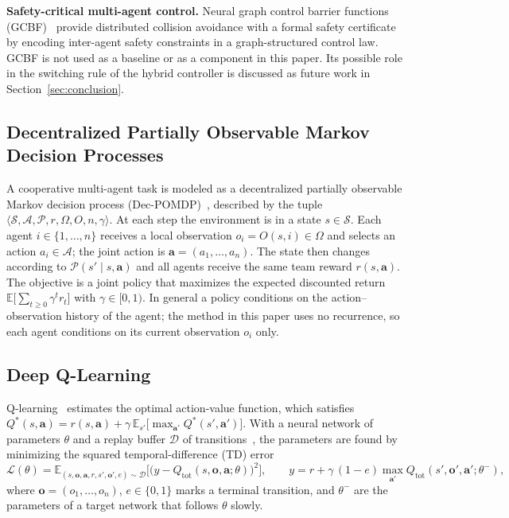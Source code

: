 \textbf{Safety-critical multi-agent control.} Neural graph control barrier functions
(GCBF)~\cite{gcbf} provide distributed collision avoidance with a formal safety
certificate by encoding inter-agent safety constraints in a graph-structured control law.
GCBF is not used as a baseline or as a component in this paper. Its possible role in the
switching rule of the hybrid controller is discussed as future work in
Section~\ref{sec:conclusion}.

\subsection{Decentralized Partially Observable Markov Decision Processes}
\label{subsec:decpomdp}
A cooperative multi-agent task is modeled as a decentralized partially observable Markov
decision process (Dec-POMDP)~\cite{decpomdp}, described by the tuple
$\langle\mathcal{S},\mathcal{A},\mathcal{P},r,\Omega,O,n,\gamma\rangle$. At each step the
environment is in a state $s\in\mathcal{S}$. Each agent $i\in\{1,\dots,n\}$ receives a local
observation $o_i = O(s,i)\in\Omega$ and selects an action $a_i\in\mathcal{A}$; the joint
action is $\mathbf{a}=(a_1,\dots,a_n)$. The state then changes according to
$\mathcal{P}(s'\mid s,\mathbf{a})$ and all agents receive the same team reward
$r(s,\mathbf{a})$. The objective is a joint policy that maximizes the expected discounted
return $\mathbb{E}\big[\sum_{t\ge 0}\gamma^t r_t\big]$ with $\gamma\in[0,1)$. In general a
policy conditions on the action--observation history of the agent; the method in this paper
uses no recurrence, so each agent conditions on its current observation $o_i$ only.

\subsection{Deep Q-Learning}
\label{subsec:qlearning}
Q-learning~\cite{watkins1992} estimates the optimal action-value function, which satisfies
$Q^*(s,\mathbf{a}) = r(s,\mathbf{a}) + \gamma\,\mathbb{E}_{s'}\big[\max_{\mathbf{a}'}Q^*(s',\mathbf{a}')\big]$.
With a neural network of parameters $\theta$ and a replay buffer $\mathcal{D}$ of
transitions~\cite{mnih2015}, the parameters are found by minimizing the squared
temporal-difference (TD) error
\begin{equation}
\label{eq:td}
\mathcal{L}(\theta) = \mathbb{E}_{(s,\mathbf{o},\mathbf{a},r,s',\mathbf{o}',e)\sim\mathcal{D}}
\Big[\big(y - Q_{\text{tot}}(s,\mathbf{o},\mathbf{a};\theta)\big)^2\Big],
\qquad
y = r + \gamma\,(1-e)\max_{\mathbf{a}'}Q_{\text{tot}}(s',\mathbf{o}',\mathbf{a}';\theta^-),
\end{equation}
where $\mathbf{o}=(o_1,\dots,o_n)$, $e\in\{0,1\}$ marks a terminal transition, and
$\theta^-$ are the parameters of a target network that follows $\theta$ slowly.


